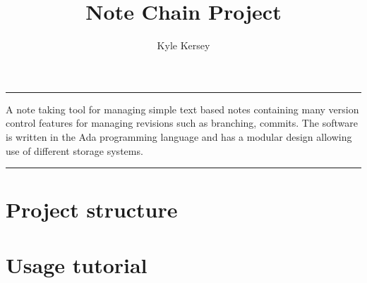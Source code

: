 \documentclass[12pt,a4paper]{article}
\renewenvironment{abstract}{%
\hfill\begin{minipage}{0.95\textwidth}
\rule{\textwidth}{1pt}}
{\par\noindent\rule{\textwidth}{1pt}\end{minipage}}
\begin{document}
%
\title{Note Chain Project}
\author{Kyle Kersey}
\date{}

\clearpage
\maketitle
%
\begin{abstract}
A note taking tool for managing simple text based notes containing many version control features for managing revisions such as branching, commits. The software is written in the Ada programming language and has a modular design allowing use of different storage systems.
\end{abstract}

\tableofcontents
\thispagestyle{empty}
\pagebreak
\setcounter{page}{1}


\section{Project structure}

\lipsum

\section{Usage tutorial}
\lipsum
\end{document}
